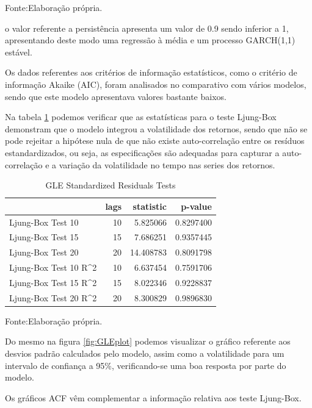 \documentclass[
  12pt,
  a4paper,
  openany]{book}
\begin{document}
Fonte:Elaboração própria.

\justifying
\bigskip

o valor referente a persistência apresenta um valor de 0.9 sendo inferior a 1, apresentando deste modo uma regressão à média e um processo GARCH(1,1) estável.

Os dados referentes aos critérios de informação estatísticos, como o critério de informação Akaike (AIC), foram analisados no comparativo com vários modelos, sendo que este modelo apresentava valores bastante baixos.

Na tabela \ref{tab:GLELjunk} podemos verificar que as estatísticas para o teste Ljung-Box demonstram que o modelo integrou a volatilidade dos retornos, sendo que não se pode rejeitar a hipótese nula de que não existe auto-correlação entre os resíduos estandardizados, ou seja, as especificações são adequadas para capturar a auto-correlação e a variação da volatilidade no tempo nas series dos retornos.

\begin{table}[!h]

\caption{\label{tab:GLELjunk}GLE Standardized Residuals Tests}
\centering
\begin{tabular}[t]{lrrr}
\toprule
  & lags & statistic & p-value\\
\midrule
Ljung-Box Test 10 & 10 & 5.825066 & 0.8297400\\
Ljung-Box Test 15 & 15 & 7.686251 & 0.9357445\\
Ljung-Box Test 20 & 20 & 14.408783 & 0.8091798\\
Ljung-Box Test 10 R\textasciicircum{}2 & 10 & 6.637454 & 0.7591706\\
Ljung-Box Test 15 R\textasciicircum{}2 & 15 & 8.022346 & 0.9228837\\
\addlinespace
Ljung-Box Test 20 R\textasciicircum{}2 & 20 & 8.300829 & 0.9896830\\
\bottomrule
\end{tabular}
\end{table}
\FloatBarrier
\centering

Fonte:Elaboração própria.

\justifying
\bigskip

Do mesmo na figura \ref{fig:GLEplot} podemos visualizar o gráfico referente aos desvios padrão calculados pelo modelo, assim como a volatilidade para um intervalo de confiança a 95\%, verificando-se uma boa resposta por parte do modelo.

Os gráficos ACF vêm complementar a informação relativa aos teste Ljung-Box.
\end{document}
